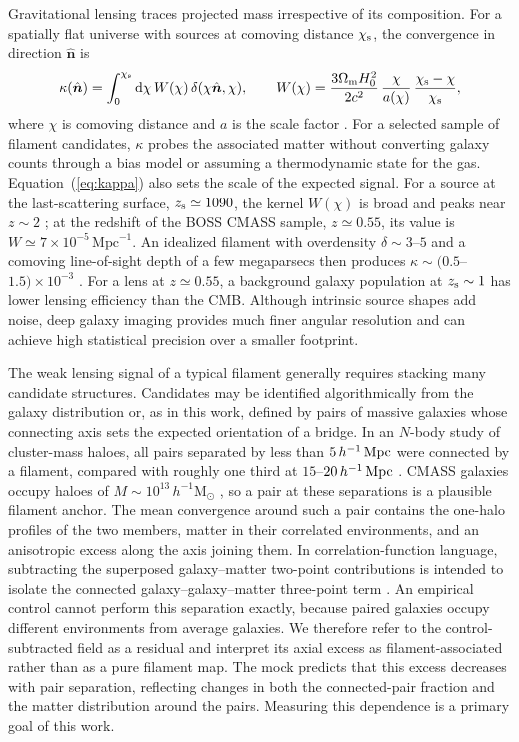 Gravitational lensing traces projected mass irrespective of its composition.
For a spatially flat universe with sources at comoving distance $\chi_{\rm s}$,
the convergence in direction $\hat{\boldsymbol n}$ is
\begin{equation}
  \kappa(\hat{\boldsymbol n}) = \int_{0}^{\chi_{\rm s}} \mathrm{d}\chi\,
  W(\chi)\,\delta(\chi\hat{\boldsymbol n},\chi), \qquad
  W(\chi) = \frac{3\Omega_{\rm m}H_{0}^{2}}{2c^{2}}\,
  \frac{\chi}{a(\chi)}\,\frac{\chi_{\rm s}-\chi}{\chi_{\rm s}},
  \label{eq:kappa}
\end{equation}
where $\chi$ is comoving distance and $a$ is the scale factor
\citep{Bartelmann2001}. For a selected sample of filament candidates, $\kappa$
probes the associated matter without converting galaxy counts through a bias
model or assuming a thermodynamic state for the gas.
Equation~(\ref{eq:kappa}) also
sets the scale of the expected signal. For a source at the last-scattering
surface, $z_{\rm s}\simeq1090$, the kernel $W(\chi)$ is broad and peaks near
$z\sim2$ \citep{LewisChallinor2006}; at the redshift of the BOSS CMASS sample,
$z\simeq0.55$, its value is $W\simeq7\times10^{-5}\,\mathrm{Mpc}^{-1}$.
An idealized filament with overdensity $\delta\sim3$--$5$ and a comoving
line-of-sight depth of a few megaparsecs then produces
$\kappa\sim(0.5$--$1.5)\times10^{-3}$ \citep{Colberg2005}. For a lens at
$z\simeq0.55$, a
background galaxy population at $z_{\rm s}\sim1$ has lower lensing efficiency
than the CMB. Although intrinsic source shapes add noise, deep galaxy imaging
provides much finer angular resolution and can achieve high statistical
precision over a smaller footprint.

The weak lensing signal of a typical filament generally requires stacking
many candidate structures. Candidates may be identified algorithmically from
the galaxy distribution or, as in this work, defined by pairs of massive
galaxies whose connecting axis sets the expected orientation of a bridge. In
an $N$-body study of cluster-mass haloes, all pairs separated by less than
$5\,h^{-1}\,{\rm Mpc}$ were connected by a filament, compared with roughly one third
at $15$--$20\,h^{-1}\,{\rm Mpc}$ \citep{Colberg2005}.
CMASS galaxies occupy haloes of $M\sim10^{13}\,h^{-1}\mathrm{M}_{\odot}$
\citep{White2011}, so a pair at these separations is a plausible filament
anchor. The mean convergence around such a pair contains the one-halo
profiles of the two members, matter in their correlated environments, and an
anisotropic excess along the axis joining them. In correlation-function
language, subtracting the superposed galaxy--matter two-point contributions
is intended to isolate the connected galaxy--galaxy--matter three-point term
\citep{Clampitt2016}. An empirical control cannot perform this separation
exactly, because paired galaxies occupy different environments from average
galaxies. We therefore refer to the control-subtracted field as a residual
and interpret its axial excess as filament-associated rather than as a pure
filament map. The mock predicts that this excess decreases with pair
separation, reflecting changes in both the connected-pair fraction and the
matter distribution around the pairs. Measuring this dependence is a primary
goal of this work.


